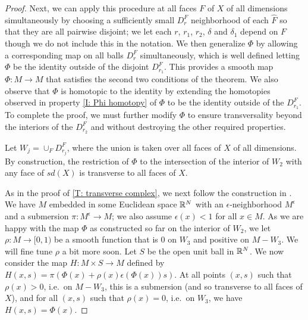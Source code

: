 \begin{proof}

	Next, we can apply this procedure at all faces $F$ of $X$ of all dimensions simultaneously by choosing a sufficiently small $D^F_r$ neighborhood of each $\hat F$ so that they are all pairwise disjoint; we let each $r$, $r_1$, $r_2$, $\delta$ and $\delta_1$ depend on $F$ though we do not include this in the notation.
	We then generalize $\Phi$ by allowing a corresponding map on all balls $D_r^F$ simultaneously, which is well defined letting $\Phi$ be the identity outside of the disjoint $D_{r_1}^F$.
	This provides a smooth map $\Phi \colon M \to M$ that satisfies the second two conditions of the theorem.
	We also observe that $\Phi$ is homotopic to the identity by extending the homotopies observed in property \eqref{I: Phi homotopy} of $\Phi$ to be the identity outside of the $D_{r_1}^F$.
	To complete the proof, we must further modify $\Phi$ to ensure transversality beyond the interiors of the $D_{r_2}^F$ and without destroying the other required properties.

	Let $W_j = \cup_F D^F_{r_j}$, where the union is taken over all faces of $X$ of all dimensions.
	By construction, the restriction of $\Phi$ to the intersection of the interior of $W_2$ with any face of $sd(X)$ is transverse to all faces of $X$.

	As in the proof of \cref{T: transverse complex}, we next follow the construction in \cite[Section 2.3]{GuPo74}.
	We have $M$ embedded in some Euclidean space $\mathbb{R}^N$ with an $\epsilon$-neighborhood $M^\epsilon$ and a submersion $\pi \colon M^\epsilon \to M$; we also assume $\epsilon(x)<1$ for all $x \in M$.
	As we are happy with the map $\Phi$ as constructed so far on the interior of $W_2$, we let $\rho \colon M \to [0,1)$ be a smooth function that is $0$ on $W_3$ and positive on $M-W_3$.
	We will fine tune $\rho$ a bit more soon.
	Let $S$ be the open unit ball in $\mathbb{R}^N$.
	We now consider the map $H \colon M \times S \to M$ defined by $H(x,s) = \pi(\Phi(x)+\rho(x)\epsilon(\Phi(x)) s)$.
	At all points $(x,s)$ such that $\rho(x)>0$, i.e.\ on $M-W_3$, this is a submersion (and so transverse to all faces of $X$), and for all $(x,s)$ such that $\rho(x) = 0$, i.e.\ on $W_3$, we have $H(x,s) = \Phi(x)$.


\end{proof}
